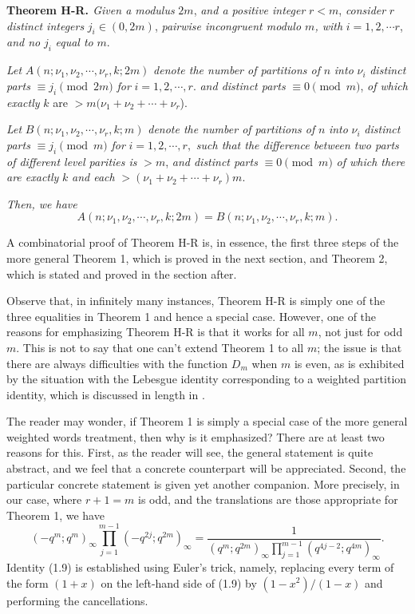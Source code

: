 \documentclass[12pt,a4paper]{amsart}
\theoremstyle{definition}
\theoremstyle{notation}
\theoremstyle{corollary}
\begin{document}
{\bf{Theorem H-R. }}{\it{Given a modulus}} $2m$, {\it{and a positive integer}}  $r<m$, {\it{consider}} $r$ {\it{distinct integers}} $j_i\in (0,2m)$, {\it{pairwise incongruent modulo $m$, with}} $i=1,2,\cdots r$, {\it{and no}} $j_i$ {\it{equal to}} $m$.

{\it{Let}} $A(n;\nu_1, \nu_2, \cdots, \nu_r, k; 2m)$ {\it{denote the number of partitions of}} $n$ {\it{into}} $\nu_i$ {\it{distinct parts}}
$\equiv j_i\pmod{2m}$ {\it{for}} $i=1,2,\cdots, r.$ {\it{and distinct parts}} $\equiv 0\pmod{m}$, {\it{of which exactly}} $k$ are $>m(\nu_1+\nu_2+\cdots+\nu_r$).

{\it{Let}} $B(n; \nu_1,\nu_2,\cdots,\nu_r, k; m)$ {\it{denote the number of partitions of}} $n$ {\it{into}} $\nu_i$ {\it{distinct parts}} $\equiv j_i\pmod{m}$
{\it{for}} $i=1,2,\cdots, r,$ {\it{such that the difference between two parts of different level parities is}} $>m$, {\it{and distinct parts}} $\equiv 0\pmod{m}$ {\it{of which there are exactly}} $k$ {\it{and each}} $>(\nu_1+\nu_2+\cdots+\nu_r)m$.

{\it{Then, we have}}
\[
A(n;\nu_1, \nu_2, \cdots, \nu_r,k; 2m)=B(n; \nu_1,\nu_2,\cdots,\nu_r,k;m).
\]

\bigskip
A combinatorial proof of Theorem H-R is, in essence, the first three steps of the more general Theorem 1,  which is proved in the next section, and Theorem 2, which is stated and proved in the section after.

Observe that, in infinitely many instances, Theorem H-R is simply one of the three equalities in Theorem 1 and hence a special case. However, one of the reasons for emphasizing Theorem H-R is that it works for all $m$, not just for odd $m$. This is not to say that one can't extend Theorem 1 to all $m$; the issue is that there are always difficulties with the function $D_m$ when $m$ is even, as is exhibited by the situation with the Lebesgue identity corresponding to a weighted partition identity, which is discussed in length in \cite{KABG93}. 

The reader may wonder, if Theorem 1 is simply a special case of the more general weighted words treatment, then why is it emphasized?  There are at least two reasons for this. First, as the reader will see, the general statement is quite abstract, and we feel that a concrete counterpart will be appreciated. Second, the particular concrete statement is given yet another companion. More precisely, in our case, where $r+1=m$ is odd, and the translations are those appropriate for Theorem 1, we have
\[
(-q^m;q^m)_{\infty}\prod^{m-1}_{j=1}(-q^{2j};q^{2m})_{\infty}
=\frac{1}{(q^m;q^{2m})_{\infty}\prod^{m-1}_{j=1}(q^{4j-2};q^{4m})_{\infty}}.\tag{1.9}
\]
Identity (1.9) is established using Euler's trick, namely, replacing every
term of the form $(1+x)$ on the left-hand side of (1.9) by $(1-x^2)/(1-x)$ and
performing the cancellations. \\ 
\end{document}
